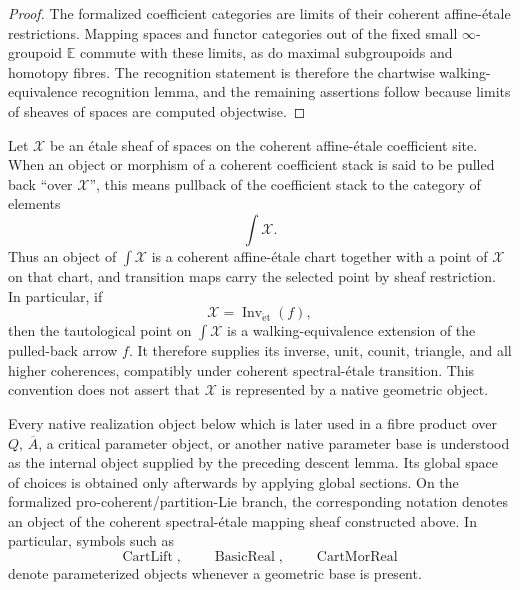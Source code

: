 \begin{proof}
The formalized coefficient categories are limits of their coherent affine-\'etale
restrictions.  Mapping spaces and functor categories out of the fixed small
$\infty$-groupoid $\mathbb E$ commute with these limits, as do maximal subgroupoids
and homotopy fibres.  The recognition statement is therefore the chartwise
walking-equivalence recognition lemma, and the remaining assertions follow because
limits of sheaves of spaces are computed objectwise.
\end{proof}

\begin{convention}
\label{conv:symmetry-noether-pullback-to-spectral-etale-realization-locus}
Let $\mathscr X$ be an \'etale sheaf of spaces on the coherent affine-\'etale
coefficient site.  When an object or morphism of a coherent coefficient stack is
said to be pulled back ``over $\mathscr X$'', this means pullback of the coefficient
stack to the category of elements
\[
\int \mathscr X.
\]
Thus an object of $\int\mathscr X$ is a coherent affine-\'etale chart together with
a point of $\mathscr X$ on that chart, and transition maps carry the selected point
by sheaf restriction.  In particular, if
\[
\mathscr X=\operatorname{Inv}_{\mathrm{\acute et}}(f),
\]
then the tautological point on $\int\mathscr X$ is a walking-equivalence extension
of the pulled-back arrow $f$.  It therefore supplies its inverse, unit, counit,
triangle, and all higher coherences, compatibly under coherent spectral-\'etale
transition.  This convention does not assert that $\mathscr X$ is represented by a
native geometric object.
\end{convention}

\begin{convention}
\label{conv:symmetry-noether-internal-and-external-realization-notation}
Every native realization object below which is later used in a fibre product over
$Q$, $\overline A$, a critical parameter object, or another native parameter base
is understood as the internal object supplied by the preceding descent lemma.  Its
global space of choices is obtained only afterwards by applying global sections.
On the formalized pro-coherent/partition-Lie branch, the corresponding notation
denotes an object of the coherent spectral-\'etale mapping sheaf constructed above.
In particular, symbols such as
\[
\operatorname{CartLift},\qquad
\operatorname{BasicReal},\qquad
\operatorname{CartMorReal}
\]
denote parameterized objects whenever a geometric base is present.
\end{convention}
